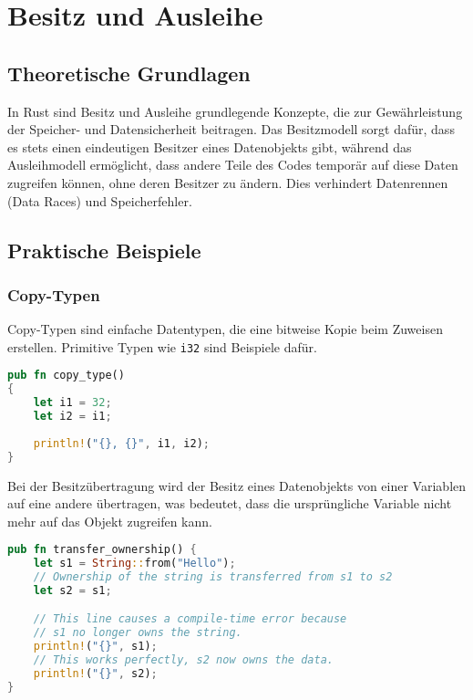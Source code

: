 \chapter{Besitz und Ausleihe}

\section{Theoretische Grundlagen}

In Rust sind Besitz und Ausleihe grundlegende Konzepte, die zur Gewährleistung der Speicher- und Datensicherheit beitragen. 
Das Besitzmodell sorgt dafür, dass es stets einen eindeutigen Besitzer eines Datenobjekts gibt, während das Ausleihmodell ermöglicht, dass andere Teile des Codes temporär auf diese Daten zugreifen können, ohne deren Besitzer zu ändern. 
Dies verhindert Datenrennen (Data Races) und Speicherfehler.

\section{Praktische Beispiele}

\subsection{Copy-Typen}
Copy-Typen sind einfache Datentypen, die eine bitweise Kopie beim Zuweisen erstellen. Primitive Typen wie \texttt{i32} sind Beispiele dafür.

\begin{lstlisting}[language=Rust, caption=Copy-Typen Beispiel]
pub fn copy_type() 
{
    let i1 = 32;
    let i2 = i1;
    
    println!("{}, {}", i1, i2);
}
\end{lstlisting}
\noindent
Bei der Besitzübertragung wird der Besitz eines Datenobjekts von einer Variablen auf eine andere übertragen, was bedeutet, dass die ursprüngliche Variable nicht mehr auf das Objekt zugreifen kann.

\begin{lstlisting}[language=Rust, caption=Unveränderliche Ausleihe Beispiel]
pub fn transfer_ownership() {
    let s1 = String::from("Hello");
    // Ownership of the string is transferred from s1 to s2
    let s2 = s1;  

    // This line causes a compile-time error because 
    // s1 no longer owns the string.
    println!("{}", s1); 
    // This works perfectly, s2 now owns the data.
    println!("{}", s2); 
}
\end{lstlisting}
\cleardoublepage
